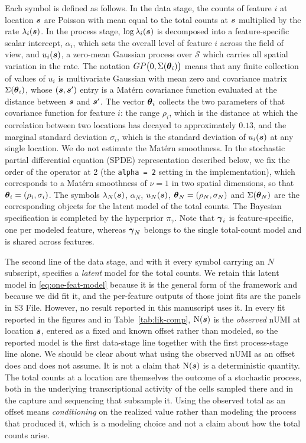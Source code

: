 \documentclass[10pt,letterpaper]{article}
\begin{document}
Each symbol is defined as follows. In the data stage, the counts of feature $i$ at location $\mbox{\boldmath $s$}$ are Poisson with mean equal to the total counts at $\mbox{\boldmath $s$}$ multiplied by the rate $\lambda_i(\mbox{\boldmath $s$})$. In the process stage, $\log\lambda_i(\mbox{\boldmath $s$})$ is decomposed into a feature-specific scalar intercept, $\alpha_i$, which sets the overall level of feature $i$ across the field of view, and $u_i(\mbox{\boldmath $s$})$, a zero-mean Gaussian process over $\mathcal{S}$ which carries all spatial variation in the rate. The notation $GP\big(0,\Sigma(\mbox{\boldmath $\theta$}_i)\big)$ means that any finite collection of values of $u_i$ is multivariate Gaussian with mean zero and covariance matrix $\Sigma(\mbox{\boldmath $\theta$}_i)$, whose $(\mbox{\boldmath $s$},\mbox{\boldmath $s$}')$ entry is a Mat\'ern covariance function evaluated at the distance between $\mbox{\boldmath $s$}$ and $\mbox{\boldmath $s$}'$. The vector $\mbox{\boldmath $\theta$}_i$ collects the two parameters of that covariance function for feature $i$: the range $\rho_i$, which is the distance at which the correlation between two locations has decayed to approximately $0.13$, and the marginal standard deviation $\sigma_i$, which is the standard deviation of $u_i(\mbox{\boldmath $s$})$ at any single location. We do not estimate the Mat\'ern smoothness. In the stochastic partial differential equation (SPDE) representation described below, we fix the order of the operator at 2 (the \texttt{alpha = 2} setting in the implementation), which corresponds to a Mat\'ern smoothness of $\nu=1$ in two spatial dimensions, so that $\mbox{\boldmath $\theta$}_i = (\rho_i, \sigma_i)$. The symbols $\lambda_N(\mbox{\boldmath $s$})$, $\alpha_N$, $u_N(\mbox{\boldmath $s$})$, $\mbox{\boldmath $\theta$}_N = (\rho_N,\sigma_N)$ and $\Sigma(\mbox{\boldmath $\theta$}_N)$ are the corresponding objects for the latent model of the total counts. The Bayesian specification is completed by the hyperprior $\pi_\gamma$. Note that $\mbox{\boldmath $\gamma$}_i$ is feature-specific, one per modeled feature, whereas $\mbox{\boldmath $\gamma$}_N$ belongs to the single total-count model and is shared across features.

The second line of the data stage, and with it every symbol carrying an $N$ subscript, specifies a \textit{latent} model for the total counts. We retain this latent model in \eqref{eq:one-feat-model} because it is the general form of the framework and because we did fit it, and the per-feature outputs of those joint fits are the panels in S3 File. However, no result reported in this manuscript uses it. In every fit reported in the figures and in Table~\ref{tab:lik-comp}, $\mbox{N}(\mbox{\boldmath $s$})$ is the \textit{observed} nUMI at location $\mbox{\boldmath $s$}$, entered as a fixed and known offset rather than modeled, so the reported model is the first data-stage line together with the first process-stage line alone. We should be clear about what using the observed nUMI as an offset does and does not assume. It is not a claim that $\mbox{N}(\mbox{\boldmath $s$})$ is a deterministic quantity. The total counts at a location are themselves the outcome of a stochastic process, both in the underlying transcriptional activity of the cells sampled there and in the capture and sequencing that subsample it. Using the observed total as an offset means \textit{conditioning} on the realized value rather than modeling the process that produced it, which is a modeling choice and not a claim about how the total counts arise.
\end{document}
